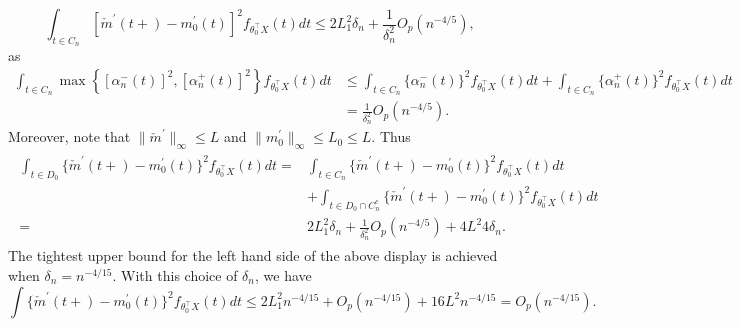\begin{equation}\label{eq:Proof_done}
 \int_{t\in C_n} [\check{m}^\prime(t+) - m_0^\prime(t) ]^2  f_{\theta_0^\top X}(t) dt \le 2 L_1^2 \delta_n +\frac{1}{\delta_n^2} O_p(n^{-4/5}),
\end{equation}
as
\begin{align*}
 \int_{t\in C_n}   \max\left\{ [\alpha_n^-(t)]^2 ,   [\alpha_n^+(t)]^2 \right\} f_{\theta_0^\top X}(t) dt 
&\le \int_{t\in C_n}  \{\alpha_n^-(t)\}^2 f_{\theta_0^\top X}(t) dt+ \int_{t\in C_n}  \{\alpha_n^+(t)\}^2 f_{\theta_0^\top X}(t)dt\\
&=\frac{1}{\delta_n^2}O_p(n^{-4/5}).
\end{align*}
Moreover, note that $\|\check{m}^\prime\|_\infty \le L$ and  $\|m_0^\prime\|_\infty \le L_0 \le L$. Thus
\begin{align}\label{eq:rate_final_deriv}
\begin{split}
\int_{t\in D_0}\{\check{m}^\prime(t+) - m_0^\prime(t)\}^2 f_{\theta_0^\top X}(t) dt ={}&\int_{t\in C_n}\{\check{m}^\prime(t+) - m_0^\prime(t)\}^2 f_{\theta_0^\top X}(t) dt \\
&+\int_{t\in D_0\cap C_n^c}\{\check{m}^\prime(t+) - m_0^\prime(t)\}^2 f_{\theta_0^\top X}(t)dt \\
={}& 2 L_1^2 \delta_n +\frac{1}{\delta_n^2} O_p(n^{-4/5})+ 4L^2 4 \delta_n.
\end{split}
\end{align}
The tightest upper bound for the left hand side of the above display is achieved when $\delta_n =n^{-4/15}$. With this choice of $\delta_n$, we have
\begin{equation}\label{eq:for_use198}
\int\{\check{m}^\prime(t+) - m_0^\prime(t)\}^2 f_{\theta_0^\top X}(t) dt  \le 2 L_1^2 n^{-4/15} +O_p(n^{-4/15})+ 16 L^2 n^{-4/15} = O_p(n^{-4/15}).
\end{equation}
